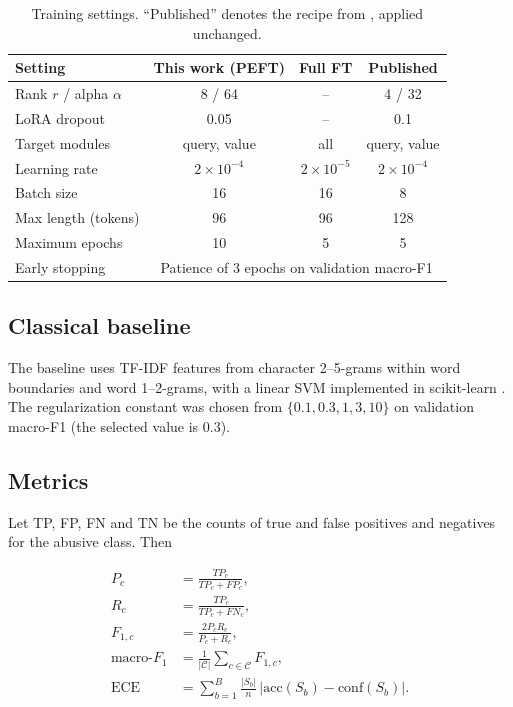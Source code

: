 \documentclass{svproc}
\begin{document}
\begin{table}[t]
\caption{Training settings. ``Published'' denotes the recipe from \cite{kaunang2026indo}, applied unchanged.}
\label{tab:hp}
\centering
\footnotesize
\setlength{\tabcolsep}{3.5pt}
\begin{tabular}{lccc}
\toprule
Setting & This work (PEFT) & Full FT & Published \\
\midrule
Rank $r$ / alpha $\alpha$ & 8 / 64 & -- & 4 / 32 \\
LoRA dropout & 0.05 & -- & 0.1 \\
Target modules & query, value & all & query, value \\
Learning rate & $2\times10^{-4}$ & $2\times10^{-5}$ & $2\times10^{-4}$ \\
Batch size & 16 & 16 & 8 \\
Max length (tokens) & 96 & 96 & 128 \\
Maximum epochs & 10 & 5 & 5 \\
Early stopping & \multicolumn{3}{c}{Patience of 3 epochs on validation macro-F1} \\
\bottomrule
\end{tabular}
\end{table}

\subsection{Classical baseline}
The baseline uses TF-IDF features from character 2--5-grams within word boundaries and word 1--2-grams, with a linear SVM \cite{cortes1995svm} implemented in scikit-learn \cite{pedregosa2011sklearn}. The regularization constant was chosen from $\{0.1,0.3,1,3,10\}$ on validation macro-F1 (the selected value is 0.3).

\subsection{Metrics}
Let TP, FP, FN and TN be the counts of true and false positives and negatives for the abusive class. Then

\begin{align}
P_c &= \frac{TP_c}{TP_c+FP_c}, \label{eq:prec}\\
R_c &= \frac{TP_c}{TP_c+FN_c}, \label{eq:rec}\\
F_{1,c} &= \frac{2P_cR_c}{P_c+R_c}, \label{eq:f1}\\
\text{macro-}F_1 &= \frac{1}{|\mathcal{C}|}\sum_{c\in\mathcal{C}} F_{1,c}, \label{eq:macrof1}\\
\mathrm{ECE} &= \sum_{b=1}^{B}\frac{|S_b|}{n}\,\bigl|\mathrm{acc}(S_b)-\mathrm{conf}(S_b)\bigr|. \label{eq:ece}
\end{align}
\end{document}
